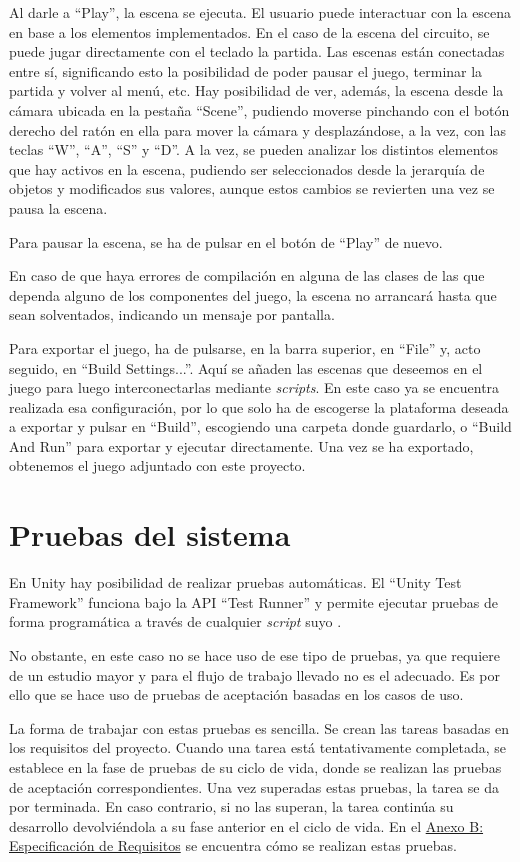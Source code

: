 Al darle a ``Play'', la escena se ejecuta. El usuario puede interactuar con la escena en base a los elementos implementados. En el caso de la escena del circuito, se puede jugar directamente con el teclado la partida. Las escenas están conectadas entre sí, significando esto la posibilidad de poder pausar el juego, terminar la partida y volver al menú, etc. Hay posibilidad de ver, además, la escena desde la cámara ubicada en la pestaña ``Scene'', pudiendo moverse pinchando con el botón derecho del ratón en ella para mover la cámara y desplazándose, a la vez, con las teclas ``W'', ``A'', ``S'' y ``D''. A la vez, se pueden analizar los distintos elementos que hay activos en la escena, pudiendo ser seleccionados desde la jerarquía de objetos y modificados sus valores, aunque estos cambios se revierten una vez se pausa la escena.

Para pausar la escena, se ha de pulsar en el botón de ``Play'' de nuevo.

En caso de que haya errores de compilación en alguna de las clases de las que dependa alguno de los componentes del juego, la escena no arrancará hasta que sean solventados, indicando un mensaje por pantalla.

Para exportar el juego, ha de pulsarse, en la barra superior, en ``File'' y, acto seguido, en ``Build Settings...''. Aquí se añaden las escenas que deseemos en el juego para luego interconectarlas mediante \textit{scripts}. En este caso ya se encuentra realizada esa configuración, por lo que solo ha de escogerse la plataforma deseada a exportar y pulsar en ``Build'', escogiendo una carpeta donde guardarlo, o ``Build And Run'' para exportar y ejecutar directamente. Una vez se ha exportado, obtenemos el juego adjuntado con este proyecto.

\section{Pruebas del sistema}

En Unity hay posibilidad de realizar pruebas automáticas. El ``Unity Test Framework'' funciona bajo la API ``Test Runner'' y permite ejecutar pruebas de forma programática a través de cualquier \textit{script} suyo \cite{testapi}.

No obstante, en este caso no se hace uso de ese tipo de pruebas, ya que requiere de un estudio mayor y para el flujo de trabajo llevado no es el adecuado. Es por ello que se hace uso de pruebas de aceptación basadas en los casos de uso.

La forma de trabajar con estas pruebas es sencilla. Se crean las tareas basadas en los requisitos del proyecto. Cuando una tarea está tentativamente completada, se establece en la fase de pruebas de su ciclo de vida, donde se realizan las pruebas de aceptación correspondientes. Una vez superadas estas pruebas, la tarea se da por terminada. En caso contrario, si no las superan, la tarea continúa su desarrollo devolviéndola a su fase anterior en el ciclo de vida. En el \hyperref[requisitos]{Anexo B: Especificación de Requisitos} se encuentra cómo se realizan estas pruebas.